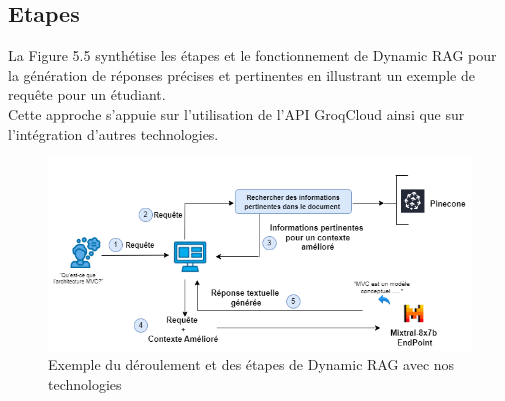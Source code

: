 \subsection{Etapes}
La Figure 5.5 synthétise les étapes et le fonctionnement de Dynamic RAG pour la génération de réponses précises et pertinentes en illustrant un exemple de requête pour un étudiant.\\
Cette approche s'appuie sur l'utilisation de l'API GroqCloud ainsi que sur l'intégration d'autres technologies.
\begin{figure}[H]
    \centering
    \includegraphics[width=\textwidth]{images/chp5/fig5.png}
    \caption{Exemple du déroulement et des étapes de Dynamic RAG avec nos technologies}
    \label{fig:Exemple du déroulement et des étapes de Dynamic RAG avec nos technologies}
\end{figure}


